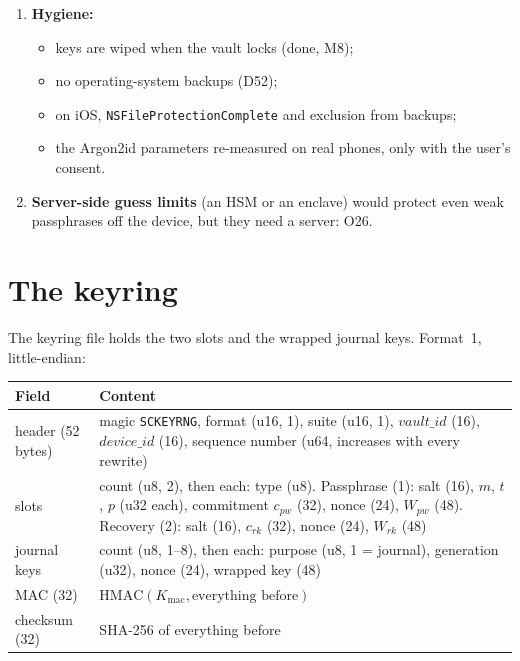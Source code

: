 \documentclass[11pt,a4paper]{article}
\newcommand{\dref}[1]{\textsf{#1}} %
\begin{document}
\begin{enumerate}
  \item \textbf{Hygiene:}
  \begin{itemize}
    \item keys are wiped when the vault locks (done, M8);
    \item no operating-system backups (\dref{D52});
    \item on iOS, \texttt{NSFileProtectionComplete} and exclusion from backups;
    \item the Argon2id parameters re-measured on real phones, only with the user's consent.
  \end{itemize}
  \item \textbf{Server-side guess limits} (an HSM or an enclave) would protect even weak passphrases off the device, but they need a server: \dref{O26}.
\end{enumerate}

\section{The keyring}
\label{sec:keyring}

The keyring file holds the two slots and the wrapped journal keys. Format~1, little-endian:

\begin{center}\small
\begin{tabularx}{\textwidth}{@{}lX@{}}
\toprule
Field & Content \\
\midrule
header (52 bytes) & magic \texttt{SCKEYRNG}, format (u16, 1), suite (u16, 1), $\mathit{vault\_id}$ (16), $\mathit{device\_id}$ (16), sequence number (u64, increases with every rewrite) \\
slots & count (u8, 2), then each: type (u8). Passphrase (1): salt (16), $m$, $t$, $p$ (u32 each), commitment $c_{pw}$ (32), nonce (24), $W_{pw}$ (48). Recovery (2): salt (16), $c_{rk}$ (32), nonce (24), $W_{rk}$ (48) \\
journal keys & count (u8, 1--8), then each: purpose (u8, 1 = journal), generation (u32), nonce (24), wrapped key (48) \\
MAC (32) & $\mathrm{HMAC}(K_{\mathrm{mac}}, \text{everything before})$ \\
checksum (32) & SHA-256 of everything before \\
\bottomrule
\end{tabularx}
\end{center}
\end{document}
